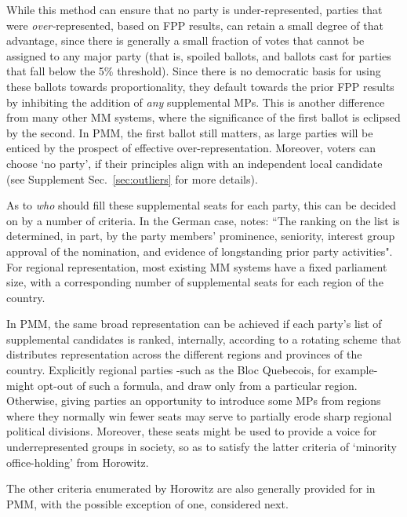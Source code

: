 While this method can ensure that no party is under-represented, parties that were \emph{over-}represented, based on FPP results, can retain a small degree of that advantage, since there is generally a small fraction of votes that cannot be assigned to any major party (that is, spoiled ballots, and ballots cast for parties that fall below the 5\% threshold).
Since there is no democratic basis for using these ballots towards proportionality, they default towards the prior FPP results by inhibiting the addition of \emph{any} supplemental MPs.
This is another difference from many other MM systems, where the significance of the first ballot is eclipsed by the second. In PMM, the first ballot still matters, as large parties will be enticed by the prospect of effective over-representation. Moreover, voters can choose `no party', if their principles align with an independent local candidate  (see Supplement Sec.~\ref{sec:outliers} for more details).

As to \emph{who} should fill these supplemental seats for each party, this can be decided on by a number of criteria.
In the German case, \citet{Stratmann} notes: ``The ranking on the list is determined, in part, by the party members' prominence, seniority, interest group approval of the nomination, and evidence of longstanding prior party activities".
For regional representation, most existing MM systems have a fixed parliament size, with a corresponding number of supplemental seats for each region of the country.

In PMM, the same broad representation can be achieved if each party's list of supplemental candidates is ranked, internally, according to a rotating scheme that distributes representation across the different regions and provinces of the country.
Explicitly regional parties \--such as the Bloc Quebecois, for example\-- might opt-out of such a formula, and draw only from a particular region.
Otherwise, giving parties an opportunity to introduce some MPs from regions where they normally win fewer seats may serve to partially erode sharp regional political divisions.
Moreover, these seats might be used to provide a voice for underrepresented groups in society, so as to satisfy the latter criteria of `minority office-holding' from Horowitz\citep{Horowitz}.

The other criteria enumerated by Horowitz are also generally provided for in PMM, with the possible exception of one, considered next.

